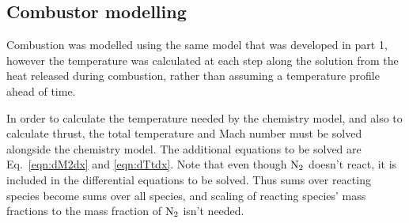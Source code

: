 \documentclass[a4paper]{article}
\begin{document}
\subsection{Combustor modelling}
Combustion was modelled using the same model that was developed in part 1, however the temperature was calculated at each step along the solution from the heat released during combustion, rather than assuming a temperature profile ahead of time.

In order to calculate the temperature needed by the chemistry model, and also to calculate thrust, the total temperature and Mach number must be solved alongside the chemistry model. The additional equations to be solved are Eq.~\ref{eqn:dM2dx} and \ref{eqn:dTtdx}. Note that even though \(\ce{N2}\) doesn't react, it is included in the differential equations to be solved. Thus sums over reacting species become sums over all species, and scaling of reacting species' mass fractions to the mass fraction of \(\ce{N2}\) isn't needed.
\end{document}
